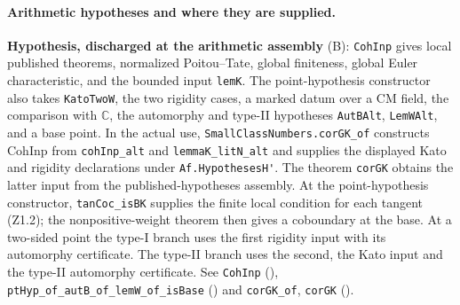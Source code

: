 \paragraph{Arithmetic hypotheses and where they are supplied.}
\textbf{Hypothesis, discharged at the arithmetic assembly} (B):
\nolinkurl{CohInp} gives local published theorems, normalized Poitou--Tate,
global finiteness, global Euler characteristic, and the bounded
input \nolinkurl{lemK}. The point-hypothesis constructor also takes
\nolinkurl{KatoTwoW}, the two rigidity cases, a marked datum over a CM
field, the comparison with $\mathbb C$, the automorphy and type-II
hypotheses \nolinkurl{AutBAlt}, \nolinkurl{LemWAlt}, and a base point.
In the actual use, \nolinkurl{SmallClassNumbers.corGK_of} constructs
$\mathrm{CohInp}$ from \nolinkurl{cohInp_alt} and \nolinkurl{lemmaK_litN_alt}
and supplies the displayed Kato and rigidity declarations under
\nolinkurl{Af.HypothesesH'}. The theorem \nolinkurl{corGK} obtains the latter input from
the published-hypotheses assembly. At the point-hypothesis constructor,
\nolinkurl{tanCoc_isBK} supplies the finite local condition for each tangent
(Z1.2); the nonpositive-weight theorem then gives a coboundary at the
base. At a two-sided point the type-I branch uses the first rigidity
input with its automorphy certificate. The type-II branch uses the
second, the Kato input and the type-II automorphy certificate.
See \nolinkurl{CohInp} (),
\nolinkurl{ptHyp_of_autB_of_lemW_of_isBase}
()
and \nolinkurl{corGK_of}, \nolinkurl{corGK}
().

